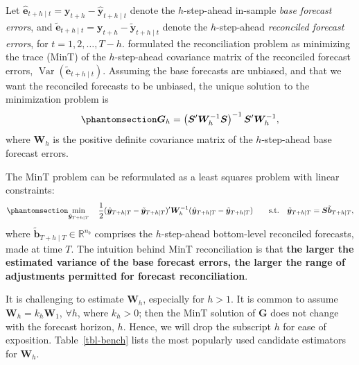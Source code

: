\documentclass[
  11pt]{article}
\theoremstyle{plain}
\theoremstyle{remark}
\begin{document}
Let
\(\hat{\bm{e}}_{t+h \mid t} = \bm{y}_{t+h} - \hat{\bm{y}}_{t+h \mid t}\)
denote the \(h\)-step-ahead in-sample \emph{base forecast errors}, and
\(\tilde{\bm{e}}_{t+h \mid t} = \bm{y}_{t+h} - \tilde{\bm{y}}_{t+h \mid t}\)
denote the \(h\)-step-ahead \emph{reconciled forecast errors}, for
\(t = 1,2,\ldots,T-h\). \citet{Wickramasuriya2019-fc} formulated the
reconciliation problem as minimizing the trace (MinT) of the
\(h\)-step-ahead covariance matrix of the reconciled forecast errors,
\(\operatorname{Var}(\tilde{\bm{e}}_{t+h \mid t})\). Assuming the base
forecasts are unbiased, and that we want the reconciled forecasts to be
unbiased, the unique solution to the minimization problem is
\begin{equation}\phantomsection\label{eq-mint}{
\bm{G}_h=\left(\bm{S}^{\prime} \bm{W}_h^{-1} \bm{S}\right)^{-1} \bm{S}^{\prime} \bm{W}_h^{-1},
}\end{equation} where \(\bm{W}_h\) is the positive definite covariance
matrix of the \(h\)-step-ahead base forecast errors.

The MinT problem can be reformulated as a least squares problem with
linear constraints: \begin{equation}\phantomsection\label{eq-mint_op}{
\min_{\tilde{\bm{y}}_{T+h \mid T}} \quad \frac{1}{2}(\hat{\bm{y}}_{T+h \mid T}-\tilde{\bm{y}}_{T+h \mid T})^{\prime} \bm{W}_{h}^{-1}(\hat{\bm{y}}_{T+h \mid T}-\tilde{\bm{y}}_{T+h \mid T})
 \qquad \text{s.t.} \quad \tilde{\bm{y}}_{T+h \mid T}=\bm{S}\tilde{\bm{b}}_{T+h \mid T},
}\end{equation} where
\(\tilde{\bm{b}}_{T+h \mid T} \in \mathbb{R}^{n_b}\) comprises the
\(h\)-step-ahead bottom-level reconciled forecasts, made at time \(T\).
The intuition behind MinT reconciliation is that \textbf{the larger the
estimated variance of the base forecast errors, the larger the range of
adjustments permitted for forecast reconciliation}.

It is challenging to estimate \(\bm{W}_h\), especially for \(h > 1\). It
is common to assume \(\bm{W}_h = k_h\bm{W}_1\), \(\forall h\), where
\(k_h > 0\); then the MinT solution of \(\bm{G}\) does not change with
the forecast horizon, \(h\). Hence, we will drop the subscript \(h\) for
ease of exposition. Table~\ref{tbl-bench} lists the most popularly used
candidate estimators for \(\bm{W}_h\).
\end{document}
